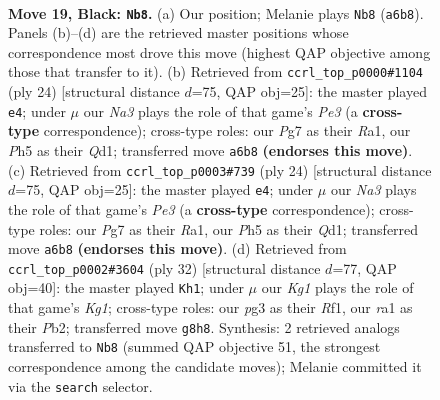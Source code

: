 \documentclass[11pt]{article}
\begin{document}
\clearpage

\begin{figure}[p]\centering
\begin{subfigure}{0.46\textwidth}\centering
\resizebox{\linewidth}{!}{%
\newchessgame
\chessboard[
  setfen={2b1r1k1/r3qpp1/np1p1n2/4p2p/P3P3/2NB1NP1/2PQ1P1P/R1R3K1 b - - 0 19},
  showmover=false,
  pgfstyle=straightmove, color=movearrow, markmove={a6-b8}
]}
\caption{}
\end{subfigure}\hfill
\begin{subfigure}{0.46\textwidth}\centering
\resizebox{\linewidth}{!}{%
\newchessgame
\chessboard[
  setfen={rnb1r1k1/pp2qp1p/3p1np1/2pP4/2P5/2NBPN1P/PP4P1/R2Q1RK1 w - - 1 13},
  showmover=false,
  pgfstyle=straightmove, color=movearrow, markmove={e3-e4}
]}
\caption{}
\end{subfigure}
\\[4pt]
\begin{subfigure}{0.46\textwidth}\centering
\resizebox{\linewidth}{!}{%
\newchessgame
\chessboard[
  setfen={rnb1r1k1/pp2qp1p/3p1np1/2pP4/2P5/2NBPN1P/PP4P1/R2Q1RK1 w - - 1 13},
  showmover=false,
  pgfstyle=straightmove, color=movearrow, markmove={e3-e4}
]}
\caption{}
\end{subfigure}\hfill
\begin{subfigure}{0.46\textwidth}\centering
\resizebox{\linewidth}{!}{%
\newchessgame
\chessboard[
  setfen={4rr1k/1ppq1ppp/p1nb1n2/P3p3/4P3/2NP1N2/1PPBQ1PP/R4RK1 w - - 3 17},
  showmover=false,
  pgfstyle=straightmove, color=movearrow, markmove={g1-h1}
]}
\caption{}
\end{subfigure}
\caption{\textbf{Move 19, Black: \texttt{Nb8}.} (a) Our position; Melanie plays \texttt{Nb8} (\texttt{a6b8}). Panels (b)--(d) are the retrieved master positions whose correspondence most drove this move (highest QAP objective among those that transfer to it). (b) Retrieved from \texttt{ccrl\_top\_p0000\#1104} (ply 24) [structural distance $d$=75, QAP obj=25]: the master played \texttt{e4}; under $\mu$ our \emph{Na3} plays the role of that game's \emph{Pe3} (a \textbf{cross-type} correspondence); cross-type roles: our \emph{P}g7 as their \emph{R}a1, our \emph{P}h5 as their \emph{Q}d1; transferred move \texttt{a6b8} \textbf{(endorses this move)}. (c) Retrieved from \texttt{ccrl\_top\_p0003\#739} (ply 24) [structural distance $d$=75, QAP obj=25]: the master played \texttt{e4}; under $\mu$ our \emph{Na3} plays the role of that game's \emph{Pe3} (a \textbf{cross-type} correspondence); cross-type roles: our \emph{P}g7 as their \emph{R}a1, our \emph{P}h5 as their \emph{Q}d1; transferred move \texttt{a6b8} \textbf{(endorses this move)}. (d) Retrieved from \texttt{ccrl\_top\_p0002\#3604} (ply 32) [structural distance $d$=77, QAP obj=40]: the master played \texttt{Kh1}; under $\mu$ our \emph{Kg1} plays the role of that game's \emph{Kg1}; cross-type roles: our \emph{p}g3 as their \emph{R}f1, our \emph{r}a1 as their \emph{P}b2; transferred move \texttt{g8h8}. Synthesis: 2 retrieved analogs transferred to \texttt{Nb8} (summed QAP objective 51, the strongest correspondence among the candidate moves); Melanie committed it via the \texttt{search} selector.}
\label{fig:thought-m37}
\end{figure}
\end{document}
